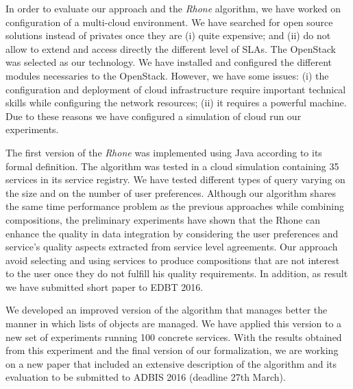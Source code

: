 \documentclass[11pt,a4paper,oneside]{report}
\begin{document}

In order to evaluate our approach and the \textit{Rhone} algorithm, we have worked on configuration of a multi-cloud environment. We have searched for open source solutions instead of privates once they are (i) quite expensive; and (ii) do not allow to extend and access directly the different level of SLAs. The OpenStack was selected as our technology. We have installed and configured the different modules necessaries to the OpenStack. However, we have some issues: (i) the configuration and deployment of cloud infrastructure require important technical skills while configuring the network resources; (ii) it requires a powerful machine. Due to these reasons we have configured a simulation of cloud run our experiments.

The first version of the \textit{Rhone} was implemented using Java according to its formal definition. The algorithm was tested in a cloud simulation containing 35 services in its service registry. We have tested different types of query varying on the size and on the number of user preferences. Although our algorithm shares the same time performance problem as the previous approaches while combining compositions, the preliminary experiments have shown that the Rhone can enhance the quality in data integration by considering the user preferences and service’s quality aspects extracted from service level agreements. Our approach avoid selecting and using services to produce compositions that are not interest to the user once they do not fulfill his quality requirements. In addition, as result we have submitted short paper to EDBT 2016. 

We developed an improved version of the algorithm that manages better the manner in which lists of objects are managed. We have applied this version to a new set of experiments running 100 concrete services. With the results obtained from this experiment and the final version of our formalization, we are working on a new paper that included an extensive description of the algorithm and its evaluation to be submitted to ADBIS 2016 (deadline 27th March).
\end{document}
